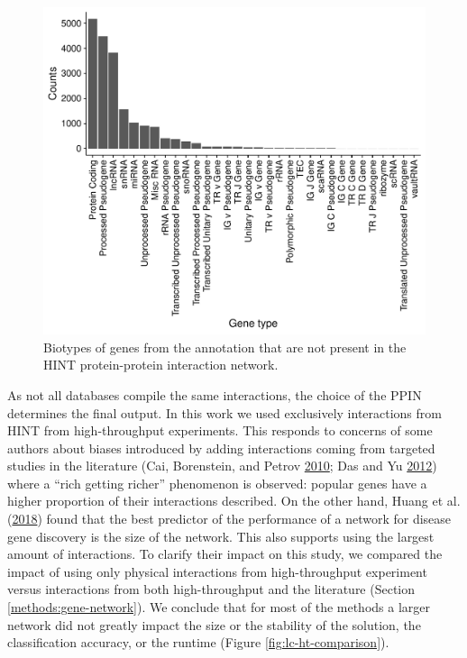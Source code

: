\documentclass[
  11pt,
]{env/yjiao}
\begin{document}
\begin{figure}
\centering
\includegraphics{fig/sfigure_9.pdf}
\caption{\label{fig:biotypes-excluded}Biotypes of genes from the annotation that are not present in the HINT protein-protein interaction network.}
\end{figure}

As not all databases compile the same interactions, the choice of the
PPIN determines the final output. In this work we used exclusively
interactions from HINT from high-throughput experiments. This responds
to concerns of some authors about biases introduced by adding
interactions coming from targeted studies in the literature
(Cai, Borenstein, and Petrov \protect\hyperlink{ref-cai_broker_2010}{2010}; Das and Yu \protect\hyperlink{ref-das_hint_2012}{2012}) where a ``rich getting richer''
phenomenon is observed: popular genes have a higher proportion of their
interactions described. On the other hand, Huang et al. (\protect\hyperlink{ref-huang_systematic_2018}{2018}) found that the best
predictor of the performance of a network for disease gene discovery is
the size of the network. This also supports
using the largest amount of interactions. To clarify their impact on
this study, we compared the impact of using only physical interactions
from high-throughput experiment versus interactions from both
high-throughput and the literature (Section \ref{methods:gene-network}). We
conclude that for most of the methods a larger network did not greatly impact
the size or the stability of the solution, the classification accuracy, or the
runtime (Figure \ref{fig:lc-ht-comparison}).
\end{document}
